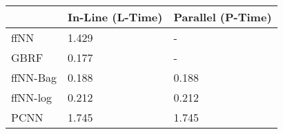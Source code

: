 \begin{tabular}{lll}
\toprule
{} & In-Line (L-Time) & Parallel (P-Time) \\
\midrule
ffNN     &            1.429 &                 - \\
GBRF     &            0.177 &                 - \\
ffNN-Bag &            0.188 &             0.188 \\
ffNN-log &            0.212 &             0.212 \\
PCNN     &            1.745 &             1.745 \\
\bottomrule
\end{tabular}
